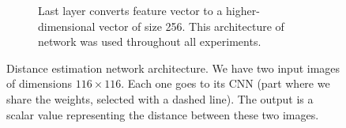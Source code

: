 \begin{figure}[ht!]
\begin{subfigure}[t]{0.47\linewidth}
        \caption{%
           Last layer converts feature vector to a higher-dimensional vector of size 256. This architecture of network was used throughout all experiments.
        }\label{fig:de-architecture:256d}
    \end{subfigure}
    \caption{%
        Distance estimation network architecture.
        We have two input images of dimensions $116 \times 116$.
        Each one goes to its CNN (part where we share the weights, selected with a dashed line).
        The output is a scalar value representing the distance between these two images.
    }\label{fig:de-architecture}
\end{figure}
